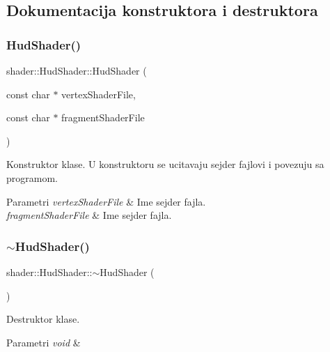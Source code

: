 \subsection{Dokumentacija konstruktora i destruktora}
\mbox{\label{classshader_1_1HudShader_a0eaa23fb174467b4006da9de33a9f3a0}} 
\subsubsection{\texorpdfstring{Hud\+Shader()}{HudShader()}}
{\footnotesize\ttfamily shader\+::\+Hud\+Shader\+::\+Hud\+Shader (\begin{DoxyParamCaption}\item[{const char $\ast$}]{vertex\+Shader\+File,  }\item[{const char $\ast$}]{fragment\+Shader\+File }\end{DoxyParamCaption})}



Konstruktor klase. U konstruktoru se ucitavaju sejder fajlovi i povezuju sa programom. 


\begin{DoxyParams}{Parametri}
{\em vertex\+Shader\+File} & Ime sejder fajla. \\
\hline
{\em fragment\+Shader\+File} & Ime sejder fajla. \\
\hline
\end{DoxyParams}
\mbox{\label{classshader_1_1HudShader_a40b9a50318827b37e1eeac09545b7727}} 
\subsubsection{\texorpdfstring{$\sim$\+Hud\+Shader()}{~HudShader()}}
{\footnotesize\ttfamily shader\+::\+Hud\+Shader\+::$\sim$\+Hud\+Shader (\begin{DoxyParamCaption}{ }\end{DoxyParamCaption})}



Destruktor klase. 


\begin{DoxyParams}{Parametri}
{\em void} & \\
\hline
\end{DoxyParams}


